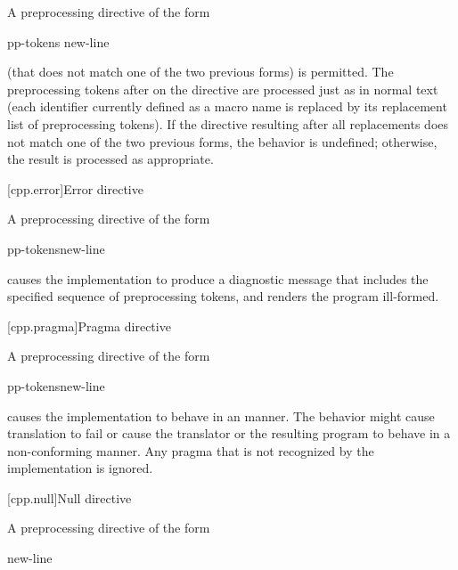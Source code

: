 \pnum
A preprocessing directive of the form

\begin{ncsimplebnf}
 pp-tokens new-line
\end{ncsimplebnf}

(that does not match one of the two previous forms)
is permitted.
The preprocessing tokens after
on the directive are processed just as in normal text
(each identifier currently defined as a macro name is replaced by its
replacement list of preprocessing tokens).
If the directive resulting after all replacements does not match
one of the two previous forms, the behavior is undefined;
otherwise, the result is processed as appropriate.

[cpp.error]{Error directive}%
%

\pnum
A preprocessing directive of the form

\begin{ncsimplebnf}
 pp-tokens\opt new-line
\end{ncsimplebnf}

causes the implementation to produce
a diagnostic message that includes the specified sequence of preprocessing tokens,
and renders the program ill-formed.

[cpp.pragma]{Pragma directive}%
%

\pnum
A preprocessing directive of the form

\begin{ncsimplebnf}
 pp-tokens\opt new-line
\end{ncsimplebnf}

causes the implementation to behave
in an  manner.
The behavior might cause translation to fail or cause the translator or
the resulting program to behave in a non-conforming manner.
Any pragma that is not recognized by the implementation is ignored.

[cpp.null]{Null directive}%

\pnum
A preprocessing directive of the form

\begin{ncsimplebnf}
\terminal{\#} new-line
\end{ncsimplebnf}


